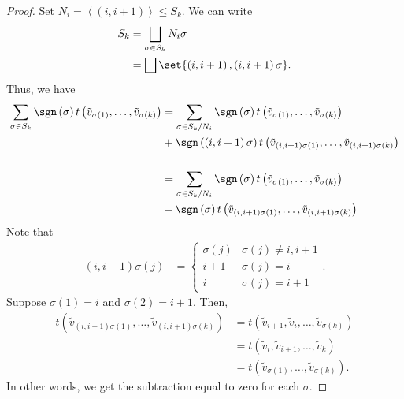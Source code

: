 \documentclass[10pt]{mypackage}
\begin{document}
\begin{proof}
      Set $N_i = \left\langle\left(i,i+1\right)\right\rangle\leq S_k$. We can write
      \begin{align*}
        S_k &= \bigsqcup_{\sigma\in S_k}N_i\sigma\\
            &= \bigsqcup \set{\left(i,i+1\right),\left(i,i+1\right)\sigma}.
      \end{align*}
      Thus, we have
      \begin{align*}
        \sum_{\sigma\in S_{k}}\sgn\left(\sigma\right)t\left(\tilde{v}_{\sigma(1)},\dots,\tilde{v}_{\sigma(k)}\right) &= \sum_{\sigma\in S_k/N_{i}}\sgn\left(\sigma\right)t\left(\tilde{v}_{\sigma(1)},\dots,\tilde{v}_{\sigma(k)}\right) \\
                                                                                                                     &+ \sgn\left(\left(i,i+1\right)\sigma\right)t\left(\tilde{v}_{\left(i,i+1\right)\sigma(1)},\dots,\tilde{v}_{\left(i,i+1\right)\sigma(k)}\right)\\
                                                                                                                     \\
                             &= \sum_{\sigma\in S_k/N_{i}}\sgn\left(\sigma\right)t\left(\tilde{v}_{\sigma(1)},\dots,\tilde{v}_{\sigma(k)}\right) \\
                             &- \sgn\left(\sigma\right)t\left(\tilde{v}_{\left(i,i+1\right)\sigma(1)},\dots,\tilde{v}_{\left(i,i+1\right)\sigma(k)}\right)
      \end{align*}
      Note that
      \begin{align*}
        \left(i,i+1\right)\sigma(j) &= \begin{cases}
          \sigma(j) & \sigma(j)\neq i,i+1\\
          i+1 & \sigma(j) = i\\
          i & \sigma(j) = i+1
        \end{cases}.
      \end{align*}
      Suppose $\sigma(1) = i$ and $\sigma(2) = i+1$. Then,
      \begin{align*}
        t\left(\tilde{v}_{\left(i,i+1\right)\sigma(1)},\dots,\tilde{v}_{\left(i,i+1\right)\sigma(k)}\right) &= t\left(\tilde{v}_{i+1},\tilde{v}_{i},\dots,\tilde{v}_{\sigma(k)}\right)\\
                                                                                                            &= t\left(\tilde{v}_{i},\tilde{v}_{i+1},\dots,\tilde{v}_{k}\right)\\
                                                                                                            &= t\left(\tilde{v}_{\sigma(1)},\dots,\tilde{v}_{\sigma(k)}\right).
      \end{align*}
      In other words, we get the subtraction equal to zero for each $\sigma$.\newline


\end{proof}
\end{document}

